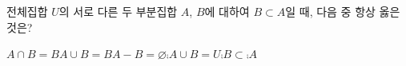 전체집합 $U$의 서로 다른 두 부분집합 $A$, $B$에 대하여 $B\subset A$일 때, 다음 중 항상 옳은 것은?
\begin{choices32}{$A\cap B=B$}{$A\cup B=B$}{$A-B=\varnothing$}{$\comp{A}\cup B=U$}{$\comp{B}\subset\comp{A}$}\end{choices32}

